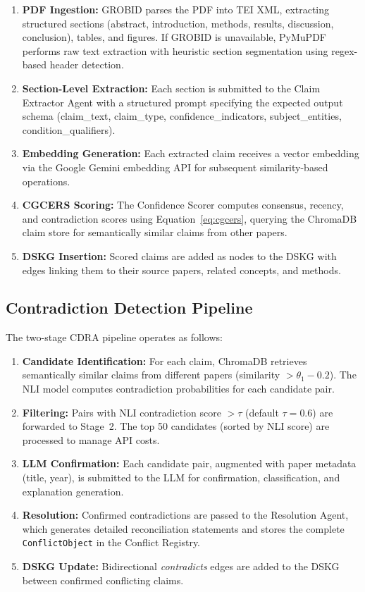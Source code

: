 \begin{enumerate}
    \item \textbf{PDF Ingestion:} GROBID parses the PDF into TEI XML, extracting structured sections (abstract, introduction, methods, results, discussion, conclusion), tables, and figures. If GROBID is unavailable, PyMuPDF performs raw text extraction with heuristic section segmentation using regex-based header detection.
    \item \textbf{Section-Level Extraction:} Each section is submitted to the Claim Extractor Agent with a structured prompt specifying the expected output schema (claim\_text, claim\_type, confidence\_indicators, subject\_entities, condition\_qualifiers).
    \item \textbf{Embedding Generation:} Each extracted claim receives a vector embedding via the Google Gemini embedding API for subsequent similarity-based operations.
    \item \textbf{CGCERS Scoring:} The Confidence Scorer computes consensus, recency, and contradiction scores using Equation~\ref{eq:cgcers}, querying the ChromaDB claim store for semantically similar claims from other papers.
    \item \textbf{DSKG Insertion:} Scored claims are added as nodes to the DSKG with edges linking them to their source papers, related concepts, and methods.
\end{enumerate}

\subsection{Contradiction Detection Pipeline}

The two-stage CDRA pipeline operates as follows:

\begin{enumerate}
    \item \textbf{Candidate Identification:} For each claim, ChromaDB retrieves semantically similar claims from different papers (similarity $> \theta_1 - 0.2$). The NLI model computes contradiction probabilities for each candidate pair.
    \item \textbf{Filtering:} Pairs with NLI contradiction score $> \tau$ (default $\tau = 0.6$) are forwarded to Stage~2. The top 50 candidates (sorted by NLI score) are processed to manage API costs.
    \item \textbf{LLM Confirmation:} Each candidate pair, augmented with paper metadata (title, year), is submitted to the LLM for confirmation, classification, and explanation generation.
    \item \textbf{Resolution:} Confirmed contradictions are passed to the Resolution Agent, which generates detailed reconciliation statements and stores the complete \texttt{ConflictObject} in the Conflict Registry.
    \item \textbf{DSKG Update:} Bidirectional \emph{contradicts} edges are added to the DSKG between confirmed conflicting claims.
\end{enumerate}

